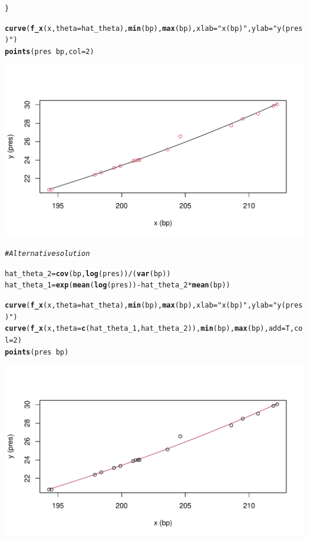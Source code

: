 \documentclass[a4paper]{article}
\makeatletter
\def\maxwidth{ %
  \ifdim\Gin@nat@width>\linewidth
    \linewidth
  \else
    \Gin@nat@width
  \fi
}
\newcommand{\hlnum}[1]{\textcolor[rgb]{0.686,0.059,0.569}{#1}}%
\newcommand{\hlstr}[1]{\textcolor[rgb]{0.192,0.494,0.8}{#1}}%
\newcommand{\hlcom}[1]{\textcolor[rgb]{0.678,0.584,0.686}{\textit{#1}}}%
\newcommand{\hlopt}[1]{\textcolor[rgb]{0,0,0}{#1}}%
\newcommand{\hlstd}[1]{\textcolor[rgb]{0.345,0.345,0.345}{#1}}%
\newcommand{\hlkwb}[1]{\textcolor[rgb]{0.69,0.353,0.396}{#1}}%
\newcommand{\hlkwc}[1]{\textcolor[rgb]{0.333,0.667,0.333}{#1}}%
\newcommand{\hlkwd}[1]{\textcolor[rgb]{0.737,0.353,0.396}{\textbf{#1}}}%
\newenvironment{kframe}{%
 \def\at@end@of@kframe{}%
 \ifinner\ifhmode%
  \def\at@end@of@kframe{\end{minipage}}%
  \begin{minipage}{\columnwidth}%
 \fi\fi%
 \def\FrameCommand##1{\hskip\@totalleftmargin \hskip-\fboxsep
 \colorbox{shadecolor}{##1}\hskip-\fboxsep
     \hskip-\linewidth \hskip-\@totalleftmargin \hskip\columnwidth}%
 \MakeFramed {\advance\hsize-\width
   \@totalleftmargin\z@ \linewidth\hsize
   \@setminipage}}%
 {\par\unskip\endMakeFramed%
 \at@end@of@kframe}
\newenvironment{knitrout}{}{} %
\makeatother
\begin{document}
{\begin{enumerate}
\begin{knitrout}
\begin{kframe}
\begin{alltt}
\hlstd{\}}

\hlkwd{curve}\hlstd{(}\hlkwd{f_x}\hlstd{(x,}\hlkwc{theta} \hlstd{= hat_theta),}\hlkwd{min}\hlstd{(bp),}\hlkwd{max}\hlstd{(bp),}\hlkwc{xlab}\hlstd{=}\hlstr{"x (bp)"}\hlstd{,}\hlkwc{ylab}\hlstd{=}\hlstr{"y (pres)"}\hlstd{)}
\hlkwd{points}\hlstd{(pres}\hlopt{~}\hlstd{bp,}\hlkwc{col}\hlstd{=}\hlnum{2}\hlstd{)}
\end{alltt}
\end{kframe}
\includegraphics[width=\maxwidth]{figure/unnamed-chunk-2-1} 
\begin{kframe}\begin{alltt}
\hlcom{# Alternative solution}

\hlstd{hat_theta_2} \hlkwb{=} \hlkwd{cov}\hlstd{(bp,}\hlkwd{log}\hlstd{(pres))}\hlopt{/}\hlstd{(}\hlkwd{var}\hlstd{(bp))}
\hlstd{hat_theta_1} \hlkwb{=} \hlkwd{exp}\hlstd{(}\hlkwd{mean}\hlstd{(}\hlkwd{log}\hlstd{(pres))}\hlopt{-}\hlstd{hat_theta_2}\hlopt{*}\hlkwd{mean}\hlstd{(bp))}

\hlkwd{curve}\hlstd{(}\hlkwd{f_x}\hlstd{(x,}\hlkwc{theta} \hlstd{= hat_theta),}\hlkwd{min}\hlstd{(bp),}\hlkwd{max}\hlstd{(bp),}\hlkwc{xlab}\hlstd{=}\hlstr{"x (bp)"}\hlstd{,}\hlkwc{ylab}\hlstd{=}\hlstr{"y (pres)"}\hlstd{)}
\hlkwd{curve}\hlstd{(}\hlkwd{f_x}\hlstd{(x,}\hlkwc{theta} \hlstd{=} \hlkwd{c}\hlstd{(hat_theta_1,hat_theta_2)),}\hlkwd{min}\hlstd{(bp),}\hlkwd{max}\hlstd{(bp),}\hlkwc{add}\hlstd{=T,}\hlkwc{col}\hlstd{=}\hlnum{2}\hlstd{)}
\hlkwd{points}\hlstd{(pres}\hlopt{~}\hlstd{bp)}
\end{alltt}
\end{kframe}
\includegraphics[width=\maxwidth]{figure/unnamed-chunk-2-2} 
\end{knitrout}

\end{enumerate}
}
\end{document}
